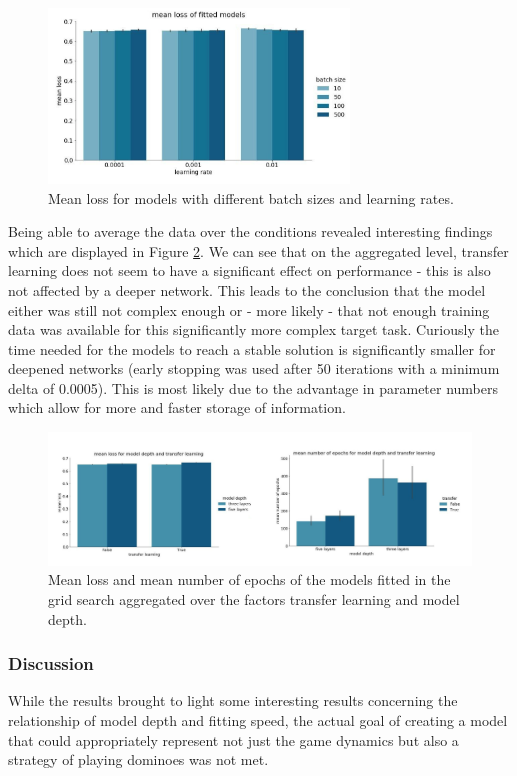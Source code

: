 \documentclass[12pt,a4paper]{article}
\begin{document}
\begin{figure}
  \includegraphics[width=8cm]{img/means_aggr.jpg}
  \centering 
  \caption{Mean loss for models with different batch sizes and learning rates.}
  \label{fig:means_aggr}
\end{figure}

Being able to average the data over the conditions revealed interesting findings which are displayed in Figure \ref{fig:grdsrch}. We can see that on the aggregated level, transfer learning does not seem to have a significant effect on performance - this is also not affected by a deeper network. This leads to the conclusion that the model either was still not complex enough or - more likely - that not enough training data was available for this significantly more complex target task. Curiously the time needed for the models to reach a stable solution is significantly smaller for deepened networks (early stopping was used after 50 iterations with a minimum delta of 0.0005). This is most likely due to the advantage in parameter numbers which allow for more and faster storage of information.

\begin{figure}
  \includegraphics[width=\linewidth]{img/gridsrch_comb.jpg}
  \centering 
  \caption{Mean loss and mean number of epochs of the models fitted in the grid search aggregated over the factors transfer learning and model depth.}
  \label{fig:grdsrch}
\end{figure}

\subsubsection{Discussion}
While the results brought to light some interesting results concerning the relationship of model depth and fitting speed, the actual goal of creating a model that could appropriately represent not just the game dynamics but also a strategy of playing dominoes was not met. 
\end{document}
